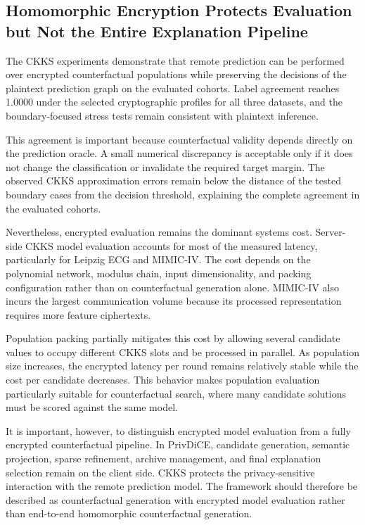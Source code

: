 \documentclass[preprint,12pt]{elsarticle}
\begin{document}
\subsection{Homomorphic Encryption Protects Evaluation but Not the Entire
Explanation Pipeline}
\label{subsec:discussion_he}

The CKKS experiments demonstrate that remote prediction can be performed over
encrypted counterfactual populations while preserving the decisions of the
plaintext prediction graph on the evaluated cohorts. Label agreement reaches
1.0000 under the selected cryptographic profiles for all three datasets, and
the boundary-focused stress tests remain consistent with plaintext inference.

This agreement is important because counterfactual validity depends directly on
the prediction oracle. A small numerical discrepancy is acceptable only if it
does not change the classification or invalidate the required target margin.
The observed CKKS approximation errors remain below the distance of the tested
boundary cases from the decision threshold, explaining the complete agreement
in the evaluated cohorts.

Nevertheless, encrypted evaluation remains the dominant systems cost.
Server-side CKKS model evaluation accounts for most of the measured latency,
particularly for Leipzig ECG and MIMIC-IV. The cost depends on the polynomial
network, modulus chain, input dimensionality, and packing configuration rather
than on counterfactual generation alone. MIMIC-IV also incurs the largest
communication volume because its processed representation requires more feature
ciphertexts.

Population packing partially mitigates this cost by allowing several candidate
values to occupy different CKKS slots and be processed in parallel. As
population size increases, the encrypted latency per round remains relatively
stable while the cost per candidate decreases. This behavior makes population
evaluation particularly suitable for counterfactual search, where many
candidate solutions must be scored against the same model.

It is important, however, to distinguish encrypted model evaluation from a
fully encrypted counterfactual pipeline. In PrivDiCE, candidate generation,
semantic projection, sparse refinement, archive management, and final
explanation selection remain on the client side. CKKS protects the
privacy-sensitive interaction with the remote prediction model. The framework
should therefore be described as counterfactual generation with encrypted model
evaluation rather than end-to-end homomorphic counterfactual generation.
\end{document}
